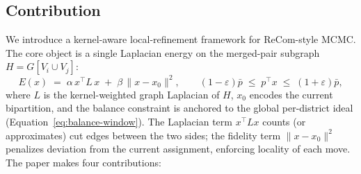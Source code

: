\documentclass[11pt]{article}
\begin{document}
\subsection{Contribution}\label{sec:intro-contribution}

We introduce a kernel-aware local-refinement framework for ReCom-style
MCMC. The core object is a single Laplacian energy on the merged-pair
subgraph $H = G[V_i \cup V_j]$:
\begin{equation}\label{eq:core-energy}
  E(x) \;=\; \alpha\, x^\top L\, x \;+\; \beta\, \|x - x_0\|^2,
  \qquad
  (1 - \varepsilon)\bar p \;\le\; p^\top x \;\le\; (1+\varepsilon)\bar p,
\end{equation}
where $L$ is the kernel-weighted graph Laplacian of $H$, $x_0$ encodes
the current bipartition, and the balance constraint is anchored to the
global per-district ideal (Equation~\eqref{eq:balance-window}). The
Laplacian term $x^\top L x$ counts (or approximates) cut edges between
the two sides; the fidelity term $\|x - x_0\|^2$ penalizes deviation
from the current assignment, enforcing locality of each move. The
paper makes four contributions:
\end{document}
